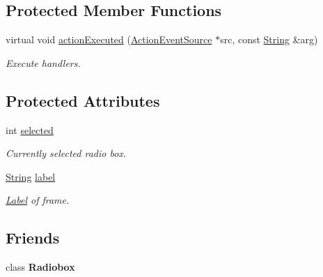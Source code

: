 \subsection*{Protected Member Functions}
\begin{DoxyCompactItemize}
\item 
\hypertarget{classGUI_1_1Frame_ad1e2d887bb7c22a47ca447fd5c6baaaf}{virtual void \hyperlink{classGUI_1_1Frame_ad1e2d887bb7c22a47ca447fd5c6baaaf}{action\-Executed} (\hyperlink{classGUI_1_1ActionEventSource}{Action\-Event\-Source} $\ast$src, const \hyperlink{classGUI_1_1String}{String} \&arg)}\label{classGUI_1_1Frame_ad1e2d887bb7c22a47ca447fd5c6baaaf}

\begin{DoxyCompactList}\small\item\em Execute handlers. \end{DoxyCompactList}\end{DoxyCompactItemize}
\subsection*{Protected Attributes}
\begin{DoxyCompactItemize}
\item 
\hypertarget{classGUI_1_1Frame_a2bbfb470946e024917df144aacbff5d6}{int \hyperlink{classGUI_1_1Frame_a2bbfb470946e024917df144aacbff5d6}{selected}}\label{classGUI_1_1Frame_a2bbfb470946e024917df144aacbff5d6}

\begin{DoxyCompactList}\small\item\em Currently selected radio box. \end{DoxyCompactList}\item 
\hypertarget{classGUI_1_1Frame_ac00ab97e44e2a591ad115e21503d5a48}{\hyperlink{classGUI_1_1String}{String} \hyperlink{classGUI_1_1Frame_ac00ab97e44e2a591ad115e21503d5a48}{label}}\label{classGUI_1_1Frame_ac00ab97e44e2a591ad115e21503d5a48}

\begin{DoxyCompactList}\small\item\em \hyperlink{classGUI_1_1Label}{Label} of frame. \end{DoxyCompactList}\end{DoxyCompactItemize}
\subsection*{Friends}
\begin{DoxyCompactItemize}
\item 
\hypertarget{classGUI_1_1Frame_a07daf9742e9ba144c14f92c739727196}{class {\bfseries Radiobox}}\label{classGUI_1_1Frame_a07daf9742e9ba144c14f92c739727196}

\end{DoxyCompactItemize}


